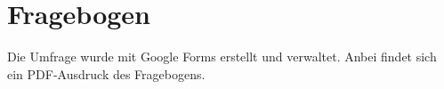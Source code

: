 \chapter{Fragebogen}
\label{app:Fragebogen}

Die Umfrage wurde mit Google Forms erstellt und verwaltet. Anbei findet sich ein PDF-Ausdruck des Fragebogens.


%

\clearpage
